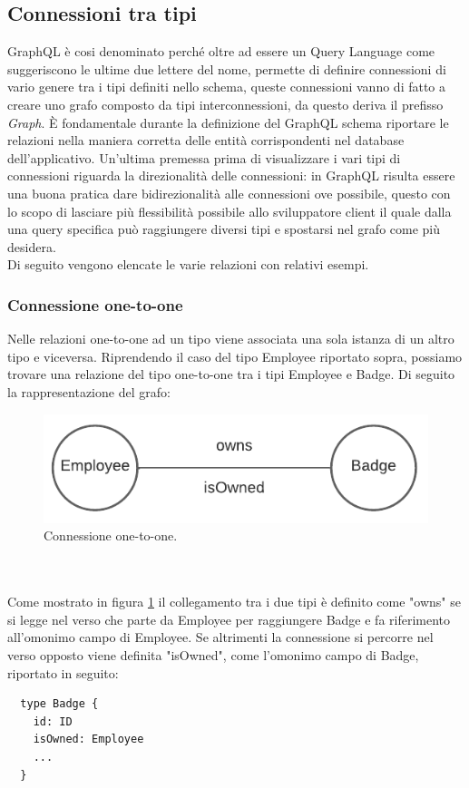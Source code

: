 \subsection*{Connessioni tra tipi}
GraphQL è cosi denominato perché oltre ad essere un Query Language come suggeriscono le ultime due lettere del nome, permette di definire connessioni di vario genere tra i tipi definiti nello schema, queste connessioni vanno di fatto a creare uno grafo composto da tipi interconnessioni, da questo deriva il prefisso \textit{Graph}.
È fondamentale durante la definizione del GraphQL schema riportare le relazioni nella maniera corretta delle entità corrispondenti nel database dell'applicativo. Un'ultima premessa prima di visualizzare i vari tipi di connessioni riguarda la direzionalità delle connessioni: in GraphQL risulta essere una buona pratica dare bidirezionalità alle connessioni ove possibile, questo con lo scopo di lasciare più flessibilità possibile allo sviluppatore client il quale dalla una query specifica può raggiungere diversi tipi e spostarsi nel grafo come più desidera.\\
Di seguito vengono elencate le varie relazioni con relativi esempi.
\subsubsection*{Connessione one-to-one}
Nelle relazioni one-to-one ad un tipo viene associata una sola istanza di un altro tipo e viceversa. Riprendendo il caso del tipo Employee riportato sopra, possiamo trovare una relazione del tipo one-to-one tra i tipi Employee e Badge. Di seguito la rappresentazione del grafo:
\begin{figure}[!h]
\centering
\includegraphics[width=0.5\linewidth]{immagini/one_to_one.pdf}
\caption{Connessione one-to-one.}
\label{one-to-one}
\end{figure}
\\ \\
Come mostrato in figura \ref{one-to-one} il collegamento tra i due tipi è definito come "owns" se si legge nel verso che parte da Employee per raggiungere Badge e fa riferimento all'omonimo campo di Employee. Se altrimenti la connessione si percorre nel verso opposto viene definita "isOwned", come l'omonimo campo di Badge, riportato in seguito:
\begin{verbatim}
  type Badge {
    id: ID
    isOwned: Employee
    ...
  }
\end{verbatim}
